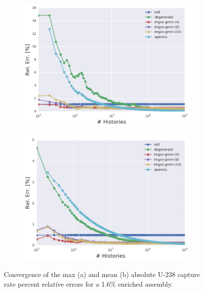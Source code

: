 \begin{figure}[h!]
\centering
\begin{subfigure}{\textwidth}
  \centering
  \includegraphics[width=0.9\linewidth]{figures/results/convergence/assm-16/max-capt-err-evo}
  \caption{}
  \label{fig:chap11-assm-1.6-capture-converge-max}
\end{subfigure}
\begin{subfigure}{\textwidth}
  \centering
  \includegraphics[width=0.9\linewidth]{figures/results/convergence/assm-16/mean-capt-err-evo}
  \caption{}
  \label{fig:chap11-assm-1.6-capture-converge-mean}
\end{subfigure}
\vspace{2mm}
\caption[Fission rate covergence for a 1.6\% enriched assembly]{Convergence of the max (a) and mean (b) absolute U-238 capture rate percent relative errors for a 1.6\% enriched assembly.}
\label{fig:chap11-assm-1.6-capture-converge}
\end{figure}

